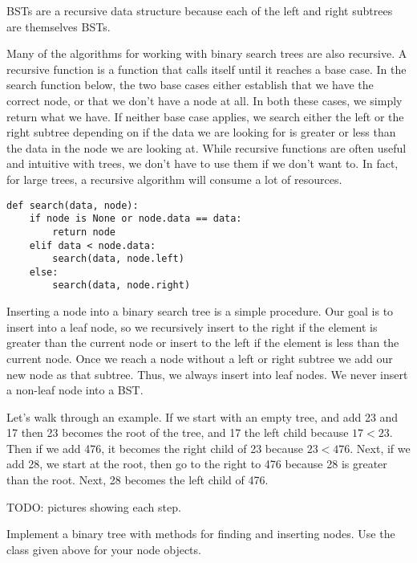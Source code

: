 BSTs are a recursive data structure because each of the left and right subtrees are themselves BSTs.

Many of the algorithms for working with binary search trees are also recursive.
A recursive function is a function that calls itself until it reaches a base case.
In the search function below, the two base cases either establish that we have the correct
node, or that we don't have a node at all.
In both these cases, we simply return what we have.
If neither base case applies, we search either the left or the right subtree depending on if the data we are looking for is greater or less than the data in the node we are looking at.
While recursive functions are often useful and intuitive with trees, we don't have to use them if we don't want to.
In fact, for large trees, a recursive algorithm will consume a lot of resources.

\begin{lstlisting}
def search(data, node):
    if node is None or node.data == data:
        return node
    elif data < node.data:
        search(data, node.left)
    else:
        search(data, node.right)
\end{lstlisting}

Inserting a node into a binary search tree is a simple procedure.
Our goal is to insert into a leaf node, so
we recursively insert to the right if the element is greater than the current node
or insert to the left if the element is less than the current node.
Once we reach a node without a left or right subtree we add our new node as that subtree.
Thus, we always insert into leaf nodes.
We never insert a non-leaf node into a BST.

Let's walk through an example.
If we start with an empty tree, and add 23 and 17 then
23 becomes the root of the tree, and 17 the left child because $17 < 23$.
Then if we add 476, it becomes the right child of 23 because $23 < 476$.
Next, if we add 28, we start at the root, then go to the right to 476 because 28 is greater than the root.
Next, 28 becomes the left child of 476.

TODO: pictures showing each step.

\begin{problem}
Implement a binary tree with methods for finding and inserting nodes.
Use the  class given above for your node objects.
\label{prob:BST1}
\end{problem}


